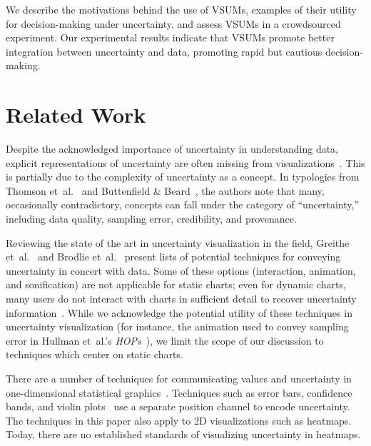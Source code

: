 \documentclass{vgtc}                          %
\newcommand{\ea}{{et~al.}\xspace}
\begin{document}
We describe the motivations behind the use of VSUMs, examples of their utility for decision-making under uncertainty, and assess VSUMs in a crowdsourced experiment. Our experimental results indicate that VSUMs promote better integration between uncertainty and data, promoting rapid but cautious decision-making.

\exampleFig
\section{Related Work}


Despite the acknowledged importance of uncertainty in understanding data, explicit representations of uncertainty are often missing from visualizations~\cite{boukhelifa2009uncertainty}. This is partially due to the complexity of uncertainty as a concept. In typologies from Thomson \ea~\cite{thomson2005typology} and Buttenfield \& Beard~\cite{buttenfield1994graphical}, the authors note that many, occasionally contradictory, concepts can fall under the category of ``uncertainty,'' including data quality, sampling error, credibility, and provenance.

Reviewing the state of the art in uncertainty visualization in the field, Greithe \ea~\cite{griethe2006visualization} and Brodlie \ea~\cite{brodlie2012review} present lists of potential techniques for conveying uncertainty in concert with data. Some of these options (interaction, animation, and sonification) are not applicable for static charts; even for dynamic charts, many users do not interact with charts in sufficient detail to recover uncertainty information~\cite{nyt2016}. While we acknowledge the potential utility of these techniques in uncertainty visualization (for instance, the animation used to convey sampling error in Hullman \ea's \emph{HOPs}~\cite{hullman2015hypothetical}), we limit the scope of our discussion to techniques which center on static charts.

There are a number of techniques for communicating values and uncertainty in one-dimensional statistical graphics~\cite{olston2002visualizing, wickham201140, neyman1937outline}. Techniques such as error bars, confidence bands, and violin plots~\cite{hintze1998violin} use a separate position channel to encode uncertainty. The techniques in this paper also apply to 2D visualizations such as heatmaps. Today, there are no established standards of visualizing uncertainty in heatmaps.
\end{document}
